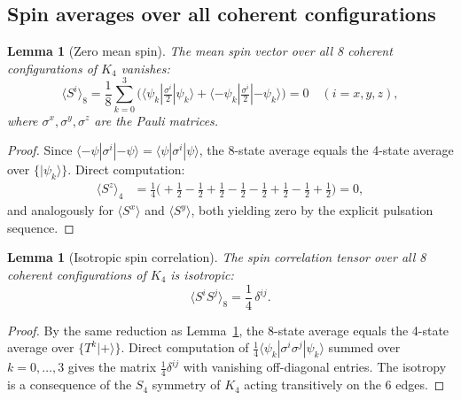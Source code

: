 \documentclass[12pt,a4paper]{article}
\newtheorem{lemma}[theorem]{Lemma}
\newcommand{\Kfour}{K_4}
\begin{document}
\subsection{Spin averages over all coherent configurations}

\begin{lemma}[Zero mean spin]
\label{lem:spin_mean}
The mean spin vector over all 8 coherent configurations of $\Kfour$ vanishes:
\begin{equation}
\langle S^i\rangle_8 = \frac{1}{8}\sum_{k=0}^{3}\bigl(\langle\psi_k|\tfrac{\sigma^i}{2}|\psi_k\rangle + \langle{-\psi_k}|\tfrac{\sigma^i}{2}|{-\psi_k}\rangle\bigr) = 0\quad (i = x,y,z),
\end{equation}
where $\sigma^x,\sigma^y,\sigma^z$ are the Pauli matrices.
\end{lemma}

\begin{proof}
Since $\langle{-\psi}|\sigma^i|{-\psi}\rangle = \langle\psi|\sigma^i|\psi\rangle$, the 8-state average equals the 4-state average over $\{|\psi_k\rangle\}$. Direct computation:
\begin{align*}
\langle S^z\rangle_4 &= \tfrac{1}{4}\bigl(+\tfrac{1}{2} - \tfrac{1}{2} + \tfrac{1}{2} - \tfrac{1}{2} - \tfrac{1}{2} + \tfrac{1}{2} - \tfrac{1}{2} + \tfrac{1}{2}\bigr) = 0,
\end{align*}
and analogously for $\langle S^x\rangle$ and $\langle S^y\rangle$, both yielding zero by the explicit pulsation sequence.
\end{proof}

\begin{lemma}[Isotropic spin correlation]
\label{lem:spin_corr}
The spin correlation tensor over all 8 coherent configurations of $\Kfour$ is isotropic:
\begin{equation}
\langle S^i S^j\rangle_8 = \frac{1}{4}\,\delta^{ij}.
\end{equation}
\end{lemma}

\begin{proof}
By the same reduction as Lemma~\ref{lem:spin_mean}, the 8-state average equals the 4-state average over $\{T^k|{+}\rangle\}$. Direct computation of $\tfrac{1}{4}\langle\psi_k|\sigma^i\sigma^j|\psi_k\rangle$ summed over $k=0,\ldots,3$ gives the matrix $\tfrac{1}{4}\delta^{ij}$ with vanishing off-diagonal entries. The isotropy is a consequence of the $S_4$ symmetry of $\Kfour$ acting transitively on the 6 edges.
\end{proof}
\end{document}
